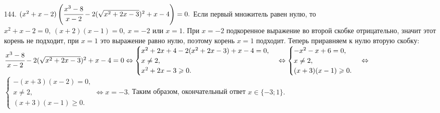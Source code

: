 144. $(x^2+x-2)\left(\cfrac{x^3-8}{x-2}-2(\sqrt{x^2+2x-3})^2
+x-4\right)=0.$ Если первый множитель равен нулю, то $x^2+x-2=0,\ (x+2)(x-1)=0,\ x=-2$ или $x=1.$ При $x=-2$ подкоренное выражение во второй скобке отрицательно, значит этот корень не подходит, при $x=1$ это выражение равно нулю, поэтому корень $x=1$ подходит. Теперь приравняем к нулю вторую скобку: $\cfrac{x^3-8}{x-2}-2(\sqrt{x^2+2x-3})^2
+x-4=0\Leftrightarrow \begin{cases} x^2+2x+4-2(x^2+2x-3)+x-4=0,\\
x\neq2,\\ x^2+2x-3\geqslant 0.\end{cases}\Leftrightarrow \begin{cases} -x^2-x+6=0,\\
x\neq2,\\ (x+3)(x-1)\geqslant 0.\end{cases}\Leftrightarrow$\\$ \begin{cases} -(x+3)(x-2)=0,\\
x\neq2,\\ (x+3)(x-1)\geqslant 0.\end{cases}\Leftrightarrow x=-3.$ Таким образом, окончательный ответ $x\in\{-3;1\}.$\\
